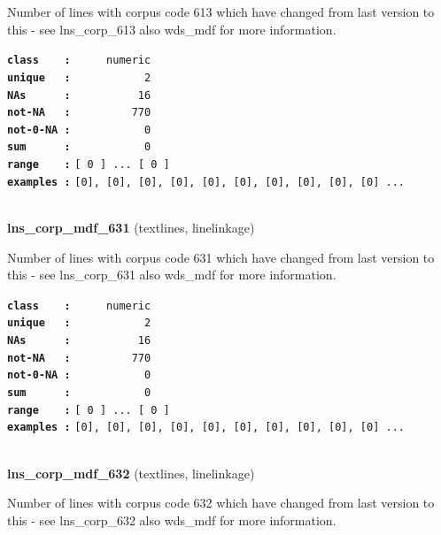 \documentclass[]{article}
\begin{document}
Number of lines with corpus code 613 which have changed from last
version to this - see lns\_corp\_613 also wds\_mdf for more information.

\textbf{\texttt{class\ \ \ \ :}} \texttt{~~~~~numeric}\\
\textbf{\texttt{unique\ \ \ :}} \texttt{~~~~~~~~~~~2}\\
\textbf{\texttt{NAs\ \ \ \ \ \ :}} \texttt{~~~~~~~~~~16}\\
\textbf{\texttt{not-NA\ \ \ :}} \texttt{~~~~~~~~~770}\\
\textbf{\texttt{not-0-NA\ :}} \texttt{~~~~~~~~~~~0}\\
\textbf{\texttt{sum\ \ \ \ \ \ :}} \texttt{~~~~~~~~~~~0}\\
\textbf{\texttt{range\ \ \ \ :}}
\texttt{{[}\ 0\ {]}\ ...\ {[}\ 0\ {]}}\\
\textbf{\texttt{examples\ :}}
\texttt{{[}0{]},\ {[}0{]},\ {[}0{]},\ {[}0{]},\ {[}0{]},\ {[}0{]},\ {[}0{]},\ {[}0{]},\ {[}0{]},\ {[}0{]}\ ...}\\

~

\textbf{lns\_corp\_mdf\_631} (textlines, linelinkage)

Number of lines with corpus code 631 which have changed from last
version to this - see lns\_corp\_631 also wds\_mdf for more information.

\textbf{\texttt{class\ \ \ \ :}} \texttt{~~~~~numeric}\\
\textbf{\texttt{unique\ \ \ :}} \texttt{~~~~~~~~~~~2}\\
\textbf{\texttt{NAs\ \ \ \ \ \ :}} \texttt{~~~~~~~~~~16}\\
\textbf{\texttt{not-NA\ \ \ :}} \texttt{~~~~~~~~~770}\\
\textbf{\texttt{not-0-NA\ :}} \texttt{~~~~~~~~~~~0}\\
\textbf{\texttt{sum\ \ \ \ \ \ :}} \texttt{~~~~~~~~~~~0}\\
\textbf{\texttt{range\ \ \ \ :}}
\texttt{{[}\ 0\ {]}\ ...\ {[}\ 0\ {]}}\\
\textbf{\texttt{examples\ :}}
\texttt{{[}0{]},\ {[}0{]},\ {[}0{]},\ {[}0{]},\ {[}0{]},\ {[}0{]},\ {[}0{]},\ {[}0{]},\ {[}0{]},\ {[}0{]}\ ...}\\

~

\textbf{lns\_corp\_mdf\_632} (textlines, linelinkage)

Number of lines with corpus code 632 which have changed from last
version to this - see lns\_corp\_632 also wds\_mdf for more information.
\end{document}
